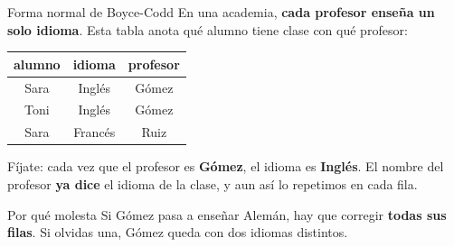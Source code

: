 \documentclass[aspectratio=169,10pt,c]{beamer}
\newcommand{\fn}[1]{\tikz[baseline=-0.5ex]{\node[rounded corners=2pt,fill=utpRojo,text=white,
  font=\bfseries\small,inner xsep=6pt,inner ysep=3pt] {#1};}}
\begin{document}

\begin{frame}{\fn{FNBC} Forma normal de Boyce-Codd}
\small En una academia, \textbf{cada profesor enseña un solo idioma}. Esta tabla anota qué alumno tiene clase con qué profesor:
\vspace{0.25cm}
\begin{center}
\footnotesize
\begin{tabular}{ccc}
\toprule
\bfseries alumno & \bfseries idioma & \bfseries profesor \\
\midrule
Sara & Inglés  & Gómez \\
Toni & Inglés  & Gómez \\
Sara & Francés & Ruiz \\
\bottomrule
\end{tabular}
\end{center}
\vspace{0.3cm}
\small Fíjate: cada vez que el profesor es \textbf{Gómez}, el idioma es \textbf{Inglés}. El nombre del profesor \textbf{ya dice} el idioma de la clase, y aun así lo repetimos en cada fila.
\vspace{0.15cm}
\begin{alertblock}{Por qué molesta}
\small Si Gómez pasa a enseñar Alemán, hay que corregir \textbf{todas sus filas}. Si olvidas una, Gómez queda con dos idiomas distintos.
\end{alertblock}
\end{frame}
\end{document}
